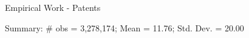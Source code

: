 \documentclass[11pt]{beamer}
\begin{document}
\begin{frame}{Empirical Work - Patents}
	\begin{center}
	\begin{figure}\centering\label{Innov7}
	\begin{minipage}[b]{0.45\linewidth}
	\end{minipage}
	\begin{minipage}[b]{0.45\linewidth}
	\end{minipage}
	\end{figure}
	\end{center}
	Summary: \# obs = 3,278,174; Mean = 11.76; Std. Dev. = 20.00
\end{frame}
\end{document}
